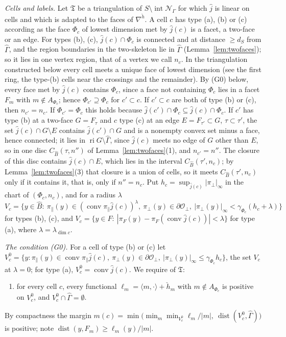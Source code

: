\emph{Cells and labels.} Let $\mathfrak T$ be a triangulation of $S\setminus\operatorname{int}\mathcal N_\Gamma$ for which $\hat j$ is linear on cells and which is adapted to the faces of $\nabla^{\check h}$. A cell $c$ has type (a), (b) or (c) according as the face $\Phi_c$ of lowest dimension met by $\hat j(c)$ is a facet, a two-face or an edge. For types (b), (c), $\hat j(c)\cap\Phi_c$ is connected and at distance $\ge d_S$ from $\widehat\Gamma$, and the region boundaries in the two-skeleton lie in $\widehat\Gamma$ (Lemma~\ref{lem:twofaces}); so it lies in one vertex region, that of a vertex we call $n_c$. In the triangulation constructed below every cell meets a unique face of lowest dimension (see the first ring, the type-(b) cells near the crossings and the remainder). By (G0) below, every face met by $\hat j(c)$ contains $\Phi_c$, since a face not containing $\Phi_c$ lies in a facet $F_m$ with $m\notin A_{\Phi_c}$; hence $\Phi_{c'}\supseteq\Phi_c$ for $c'\subset c$. If $c'\subset c$ are both of type (b) or (c), then $n_{c'}=n_c$. If $\Phi_{c'}=\Phi_c$ this holds because $\hat j(c')\cap\Phi_c\subseteq\hat j(c)\cap\Phi_c$. If $c'$ has type (b) at a two-face $G=F_\tau$ and $c$ type (c) at an edge $E=F_{\tau'}\subset G$, $\tau\subset\tau'$, the set $\hat j(c)\cap G\setminus E$ contains $\hat j(c')\cap G$ and is a nonempty convex set minus a face, hence connected; it lies in $\operatorname{ri}G\setminus\widehat\Gamma$, since $\hat j(c)$ meets no edge of $G$ other than $E$, so in one disc $C_{\widehat B}(\tau,n'')$ of Lemma~\ref{lem:twofaces}(1), and $n_{c'}=n''$. The closure of this disc contains $\hat j(c)\cap E$, which lies in the interval $C_{\widehat B}(\tau',n_c)$; by Lemma~\ref{lem:twofaces}(3) that closure is a union of cells, so it meets $C_{\widehat B}(\tau',n_c)$ only if it contains it, that is, only if $n''=n_c$. Put $h_c=\sup_{\hat j(c)}|\pi_\perp|_\infty$ in the chart of $(\Phi_c,n_c)$, and for a radius $\lambda$
\[
V_c=\bigl\{y\in\widehat B:\ \pi_\parallel(y)\in(\operatorname{conv}\pi_\parallel\hat j(c))^{\lambda},\ \pi_\perp(y)\in\partial \mathcal O_\perp,\ |\pi_\perp(y)|_\infty<\gamma_{\Phi_c}(h_c+\lambda)\bigr\}
\]
for types (b), (c), and $V_c=\{y\in F:\ |\pi_F(y)-\pi_F(\operatorname{conv}\hat j(c))|<\lambda\}$ for type (a), where $\lambda=\lambda_{\dim c}$.

\emph{The condition (G0).} For a cell of type (b) or (c) let $V^0_c=\{y:\pi_\parallel(y)\in\operatorname{conv}\pi_\parallel\hat j(c),\ \pi_\perp(y)\in\partial \mathcal O_\perp,\ |\pi_\perp(y)|_\infty\le \gamma_{\Phi_c}h_c\}$, the set $V_c$ at $\lambda=0$; for type (a), $V^0_c=\operatorname{conv}\hat j(c)$. We require of $\mathfrak T$:
\begin{enumerate}
\item[(G0)] for every cell $c$, every functional $\ell_m=\langle m,\cdot\rangle+\check h_m$ with $m\notin A_{\Phi_c}$ is positive on $V^0_c$, and $V^0_c\cap\widehat\Gamma=\emptyset$.
\end{enumerate}
By compactness the margin $m(c)=\min\bigl(\min_m\min_{V^0_c}\ell_m/|m|,\ \operatorname{dist}(V^0_c,\widehat\Gamma)\bigr)$ is positive; note $\operatorname{dist}(y,F_m)\ge\ell_m(y)/|m|$.

